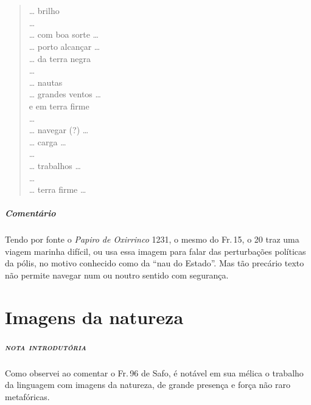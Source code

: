 \chapter*{}
\section*{}


\begin{verse}
\ldots{} brilho\\
\ldots{}\\
\ldots{} com boa sorte \ldots{}\\
\ldots{} porto alcançar \ldots{} \\
\ldots{} da terra negra\\
\ldots{} \\
\ldots{} nautas\\
\ldots{} grandes ventos \ldots{}\\
e em terra firme\\
\ldots{}\\
\ldots{} navegar (?) \ldots{}\\
\ldots{} carga \ldots{}\\
\ldots{}\\
\ldots{} trabalhos \ldots{}\\
\ldots{}\\
\ldots{} terra firme \ldots{}
\end{verse}

{\paragraph{Comentário} Tendo por fonte o \textit{Papiro de Oxirrinco} 1231, o mesmo do Fr.\,15, o 20 traz uma viagem marinha difícil, ou usa essa imagem para falar das perturbações políticas da pólis, no motivo conhecido como da ``nau do Estado''. Mas tão precário texto não permite navegar num ou noutro sentido com segurança.}

\chapter{Imagens da natureza}

\paragraph{\textsc{nota introdutória}}
Como observei ao comentar o Fr.\,96 de Safo, é notável em sua mélica o trabalho
da linguagem com imagens da natureza, de grande presença e força não raro
metafóricas.

